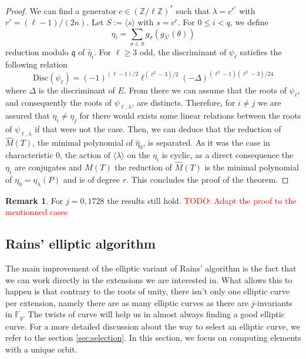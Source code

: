 \documentclass[12pt]{article}
\theoremstyle{plain}
\theoremstyle{definition}
\newtheorem*{remark}{Remark}
\newcommand{\todo}[1]{\textcolor{red}{TODO: #1}}
\def\Z{\ensuremath{\mathbb{Z}}}
\def\F{\ensuremath{\mathbb{F}}}
\newcounter{algorithm}
\begin{document}
\begin{proof}
We can find a generator $c\in(\Z/\ell\Z)^{\ast}$ such that $\lambda = c^{r'}$
with $r'=(\ell-1)/(2n)$. Let $S:=\langle{s}\rangle$ with $s=c^r$. For 
$0\leq i<q$, we define 
\begin{equation}
\eta_i = \sum_{\sigma\in S}{g_{\sigma}(g_{\lambda^i}(\theta))}
\end{equation}
reduction modulo $\mathfrak{q}$ of $\widehat{\eta}_i$. For $\ell\geq3$ odd, the
discriminant of $\psi_\ell$ satisfies the following relation \cite{MiMoScho}
\begin{equation}
\text{Disc}(\psi_\ell)=
(-1)^{(\ell-1)/2}\ell^{(\ell^2-3)/2}(-\Delta)^{(\ell^2-1)(\ell^2-3)/24}
\end{equation}
where $\Delta$ is the discriminant of $E$. From there we can assume that the
roots of $\psi_\ell$, and consequently the roots of $\psi_{\ell,\lambda}$, are
distincts. Therefore, for $i\neq j$ we are assured that $\eta_i\neq\eta_j$ for
there would exists some linear relations between the roots of
$\psi_{\ell,\lambda}$ if that were not the case. Then, we can deduce that the 
reduction of $\widehat{M}(T)$, the minimal polynomial of $\widehat{\eta}_0$, 
is separated. As it was the case in characteristic $0$, the action of 
$\langle{\lambda}\rangle$ on the $\eta_i$ is cyclic, as a direct consequence 
the $\eta_i$ are conjugates and $M(T)$ the reduction of $\widehat{M}(T)$ is 
the minimal polynomial of $\eta_0 = \eta_\lambda(P)$ and is of degree $r$. 
This concludes the proof of the theorem.
\end{proof}

\begin{remark}
For $j=0,1728$ the results still hold. \todo{Adapt the proof to the mentionned
cases}
\end{remark}

\subsection{Rains' elliptic algorithm}

The main improvement of the elliptic variant of Rains' algorithm is the fact
that we can work directly in the extensions we are interested in. What allows
this to happen is that contrary to the roots of unity, there isn't only one
elliptic curve per extension, namely there are as many elliptic curves as there
are $j$-invariants in $\F_q$. The twists of curve will help us in 
almost always finding a good elliptic curve. For a more detailed discussion 
about the way to select an elliptic curve, we refer to the section 
\ref{sec:selection}. In this section, we focus on computing elements with a 
unique orbit.
\end{document}
